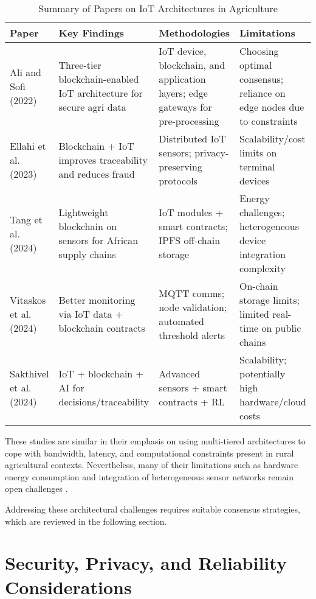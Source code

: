 \documentclass[12pt,onecolumn]{IEEEtran} %
\newcommand{\fitToPage}[1]{\begin{adjustbox}{max width=\textwidth}#1\end{adjustbox}}
\renewcommand{\arraystretch}{1.2} %
\begin{document}
\begin{table}[H]
\caption{Summary of Papers on IoT Architectures in Agriculture}
\label{table2}
\centering
\fitToPage{
\begingroup
\setlength{\tabcolsep}{4pt}
\renewcommand{\arraystretch}{1.15}
\footnotesize
\begin{tabularx}{\textwidth}{@{}P{0.18\textwidth}YYY@{}}
\toprule
\textbf{Paper} & \textbf{Key Findings} & \textbf{Methodologies} & \textbf{Limitations} \\
\midrule
Ali and Sofi (2022) & Three-tier blockchain-enabled IoT architecture for secure agri data & IoT device, blockchain, and application layers; edge gateways for pre-processing & Choosing optimal consensus; reliance on edge nodes due to constraints \\
\addlinespace
Ellahi et al. (2023) & Blockchain + IoT improves traceability and reduces fraud & Distributed IoT sensors; privacy-preserving protocols & Scalability/cost limits on terminal devices \\
\addlinespace
Tang et al. (2024) & Lightweight blockchain on sensors for African supply chains & IoT modules + smart contracts; IPFS off-chain storage & Energy challenges; heterogeneous device integration complexity \\
\addlinespace
Vitaskos et al. (2024) & Better monitoring via IoT data + blockchain contracts & MQTT comms; node validation; automated threshold alerts & On-chain storage limits; limited real-time on public chains \\
\addlinespace
Sakthivel et al. (2024) & IoT + blockchain + AI for decisions/traceability & Advanced sensors + smart contracts + RL & Scalability; potentially high hardware/cloud costs \\
\bottomrule
\end{tabularx}
\endgroup
}
\end{table}


These studies are similar in their emphasis on using multi-tiered architectures to cope with bandwidth, latency, and computational constraints present in rural agricultural contexts. Nevertheless, many of their limitations such as hardware energy consumption and integration of heterogeneous sensor networks remain open challenges \cite{morais2023surveyonintegration, tang2024assessingblockchainand}.

Addressing these architectural challenges requires suitable consensus strategies, which are reviewed in the following section.

\section{Security, Privacy, and Reliability Considerations}\label{sec:spr}
\end{document}
